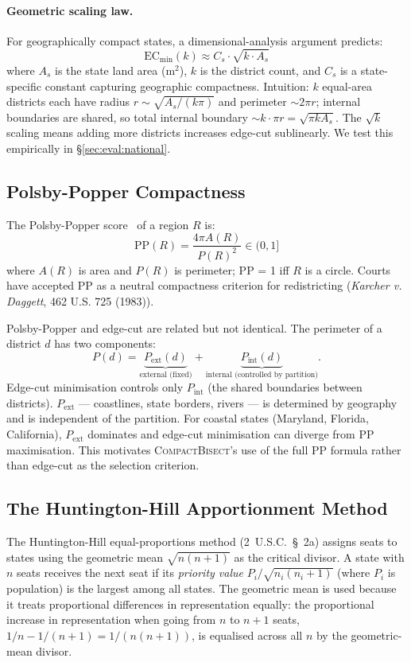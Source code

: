 \paragraph{Geometric scaling law.}
For geographically compact states, a dimensional-analysis argument predicts:
\[
  \mathrm{EC}_{\min}(k) \approx C_s \cdot \sqrt{k \cdot A_s}
\]
where $A_s$ is the state land area (m$^2$), $k$ is the district count, and
$C_s$ is a state-specific constant capturing geographic compactness.
Intuition: $k$ equal-area districts each have radius $r \sim \sqrt{A_s / (k\pi)}$
and perimeter $\sim 2\pi r$; internal boundaries are shared, so total internal
boundary $\sim k \cdot \pi r = \sqrt{\pi k A_s}$. The $\sqrt{k}$ scaling means
adding more districts increases edge-cut sublinearly. We test this empirically
in \S\ref{sec:eval:national}.

\subsection{Polsby-Popper Compactness}

The Polsby-Popper score~\citep{polsby1991third} of a region $R$ is:
\[
  \mathrm{PP}(R) = \frac{4\pi A(R)}{P(R)^2} \in (0, 1]
\]
where $A(R)$ is area and $P(R)$ is perimeter; PP = 1 iff $R$ is a circle.
Courts have accepted PP as a neutral compactness criterion for redistricting
(\emph{Karcher v. Daggett}, 462 U.S. 725 (1983)).

Polsby-Popper and edge-cut are related but not identical. The perimeter of a
district $d$ has two components:
\[
  P(d) = \underbrace{P_{\mathrm{ext}}(d)}_{\text{external (fixed)}}
        + \underbrace{P_{\mathrm{int}}(d)}_{\text{internal (controlled by partition)}}.
\]
Edge-cut minimisation controls only $P_{\mathrm{int}}$ (the shared boundaries
between districts). $P_{\mathrm{ext}}$ — coastlines, state borders, rivers —
is determined by geography and is independent of the partition. For coastal
states (Maryland, Florida, California), $P_{\mathrm{ext}}$ dominates and
edge-cut minimisation can diverge from PP maximisation. This motivates
\textsc{CompactBisect}'s use of the full PP formula rather than edge-cut as
the selection criterion.

\subsection{The Huntington-Hill Apportionment Method}

The Huntington-Hill equal-proportions method (2~U.S.C.~\S~2a) assigns seats to
states using the geometric mean $\sqrt{n(n+1)}$ as the critical divisor. A
state with $n$ seats receives the next seat if its \emph{priority value}
$P_i / \sqrt{n_i(n_i+1)}$ (where $P_i$ is population) is the largest among
all states. The geometric mean is used because it treats proportional
differences in representation equally: the proportional increase in
representation when going from $n$ to $n+1$ seats, $1/n - 1/(n+1) = 1/(n(n+1))$,
is equalised across all $n$ by the geometric-mean divisor.

